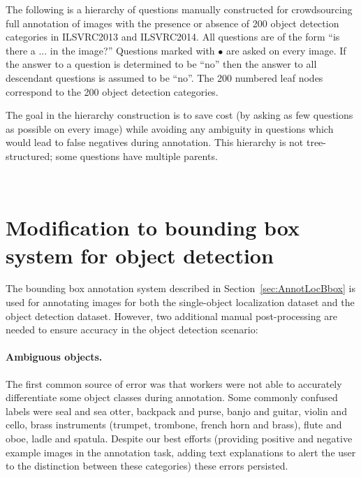 \begin{appendices}
The following is a hierarchy of questions manually constructed for crowdsourcing full annotation of images with the presence or absence of 200 object detection categories in ILSVRC2013 and ILSVRC2014. 
All questions are of the form ``is there a ... in the image?'' Questions marked with $\bullet$ are asked on every image.  If the answer to a question is determined to be ``no'' then the answer to all descendant questions is assumed to be ``no''. The 200 numbered leaf nodes correspond to the 200 object detection categories. 

The goal in the hierarchy construction is to save cost (by asking as few questions as possible on every image) while avoiding any ambiguity
in questions which would lead to false negatives during annotation. This hierarchy is not tree-structured; some questions have multiple parents. 

\vspace{0.1in}

{\tiny
{} \\

}


\section{Modification to bounding box system for object detection}
\label{sec:AppDetBbox}

The bounding box annotation system described in Section~\ref{sec:AnnotLocBbox} is used for
annotating images for both the single-object localization dataset and the object detection dataset.
However, two additional manual  post-processing are needed to ensure accuracy in the object
detection scenario:

\paragraph{Ambiguous objects.} The first common source of error was that
workers were not able to accurately differentiate some object classes during annotation. 
Some commonly confused
labels were seal and sea otter, backpack and purse, banjo and guitar, violin and cello,
brass instruments (trumpet, trombone, french horn and brass), flute and oboe, ladle and spatula. 
Despite our best efforts (providing positive and negative example images in the annotation task,
adding text explanations to alert the user to the distinction between these categories) these errors persisted.


\end{appendices}
